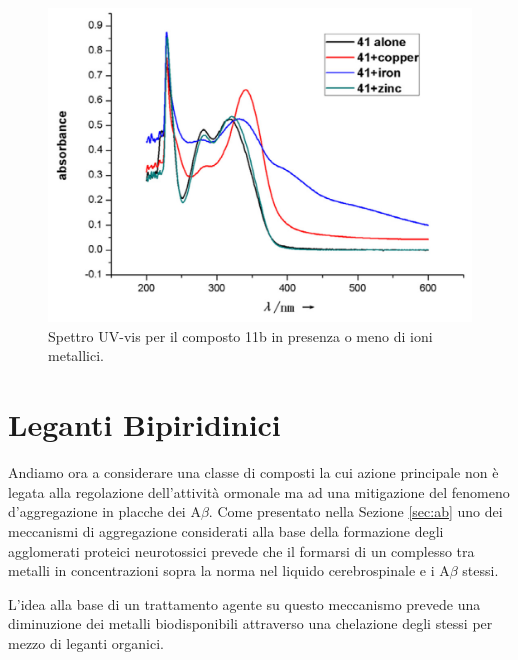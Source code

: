 \documentclass[a4paper, 12pt]{article}
\begin{document}
\begin{figure}[H]
	\centering
	\includegraphics[width=\linewidth]{immagini/metab_curcdone.png}
	\caption{Spettro UV-vis per il composto 11b in presenza o meno di ioni metallici.}
	\label{fig:metab_curcdone}
\end{figure}


\section{Leganti Bipiridinici}
\label{sec:byp}
Andiamo ora a considerare una classe di composti la cui azione principale non è legata alla regolazione dell'attività ormonale ma ad una mitigazione del fenomeno d'aggregazione in placche dei A$\beta$. Come presentato nella Sezione \ref{sec:ab} uno dei meccanismi di aggregazione considerati alla base della formazione degli agglomerati proteici neurotossici prevede che il formarsi di un complesso tra metalli in concentrazioni sopra la norma nel liquido cerebrospinale e i A$\beta$ stessi.

L'idea alla base di un trattamento agente su questo meccanismo prevede una diminuzione dei metalli biodisponibili attraverso una chelazione degli stessi per mezzo di leganti organici.
\end{document}
